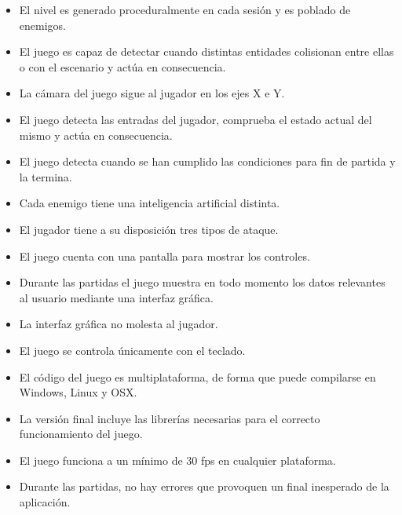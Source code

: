 	\begin{itemize}
			\item
				
			El nivel es generado proceduralmente en cada sesión y es poblado de enemigos.
			
			\item 
				
			El juego es capaz de detectar cuando distintas entidades colisionan entre ellas o con el escenario y actúa en consecuencia.

			\item 
				
			La cámara del juego sigue al jugador en los ejes X e Y.

			\item 
				
			El juego detecta las entradas del jugador, comprueba el estado actual del mismo y actúa en consecuencia.

			\item 
				
			El juego detecta cuando se han cumplido las condiciones para fin de partida y la termina.

			\item 
				
			Cada enemigo tiene una inteligencia artificial distinta.

			\item 
				
			El jugador tiene a su disposición tres tipos de ataque.

			\item 
				
			El juego cuenta con una pantalla para mostrar los controles.

			\item
					
			Durante las partidas el juego muestra en todo momento los datos relevantes al usuario mediante una interfaz gráfica.

			\item
				
			La interfaz gráfica no molesta al jugador.

			\item
				
			El juego se controla únicamente con el teclado.

			\item 
				
			El código del juego es multiplataforma, de forma que puede compilarse en Windows, Linux y OSX.

			\item 
				
			La versión final incluye las librerías necesarias para el correcto funcionamiento del juego.

			\item
					
			El juego funciona a un mínimo de 30 \acrshort{fps} en cualquier plataforma.

			\item
				
			Durante las partidas, no hay errores que provoquen un final inesperado de la aplicación.
	\end{itemize}

